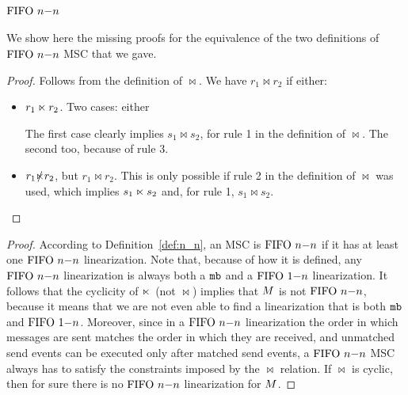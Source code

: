 \paragraph*{\bf $\text{FIFO } n\mathsf{-}n$}

We show here the missing proofs for the equivalence of the two definitions of $\text{FIFO } n\mathsf{-}n$ MSC that we gave.

\nnfirstprop*
\begin{proof}
    Follows from the definition of $\bowtie$. We have $r_1 \bowtie r_2$ if either:
    \begin{itemize}%
        \item $r_1 \ltimes r_2$. Two cases: either 
        The first case clearly implies $s_1 \bowtie s_2$, for rule 1 in the definition of $\bowtie$. The second too, because of rule 3.
        \item  $r_1 \slashed{\ltimes} r_2$, but $r_1 \bowtie r_2$. This is only possible if rule 2 in the definition of $\bowtie$ was used, which implies $s_1 \ltimes s_2$ and, for rule 1, $s_1 \bowtie s_2$.
    \end{itemize}
\end{proof}

\nnsecondprop*
\begin{proof}
    According to Definition~\ref{def:n_n}, an MSC is $\text{FIFO } n\mathsf{-}n$ if it has at least one $\text{FIFO } n\mathsf{-}n$ linearization. Note that, because of how it is defined, any $\text{FIFO } n\mathsf{-}n$ linearization is always both a $\mathtt{mb}$ and a $\text{FIFO } 1\mathsf{-}n$ linearization. It follows that the cyclicity of $\ltimes$ (not $\bowtie$) implies that $M$ is not $\text{FIFO } n\mathsf{-}n$, because it means that we are not even able to find a linearization that is both $\mathtt{mb}$ and $\text{FIFO } 1\mathsf{-}n$. Moreover, since in a $\text{FIFO } n\mathsf{-}n$ linearization the order in which messages are sent matches the order in which they are received, and unmatched send events can be executed only after matched send events, a $\text{FIFO } n\mathsf{-}n$ MSC always has to satisfy the constraints imposed by the $\bowtie$ relation. If $\bowtie$ is cyclic, then for sure there is no $\text{FIFO } n\mathsf{-}n$ linearization for $M$.
\end{proof}    

